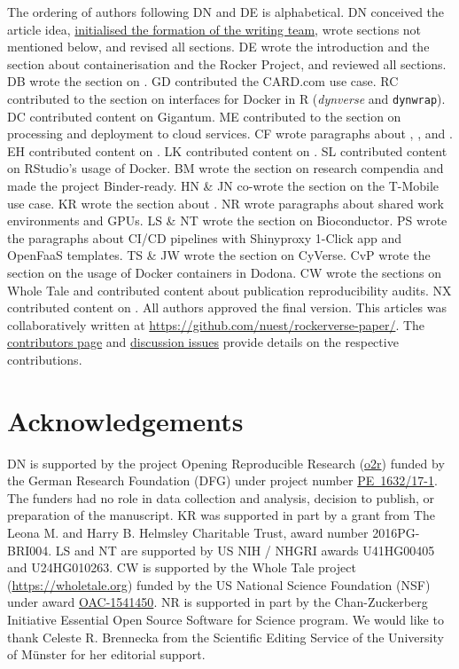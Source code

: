 The ordering of authors following DN and DE is alphabetical. DN
conceived the article idea,
\href{https://github.com/nuest/rockerverse-paper/issues/3}{initialised the formation of the writing team},
wrote sections not mentioned below, and revised all sections. DE wrote
the introduction and the section about containerisation and the Rocker
Project, and reviewed all sections. DB wrote the section on
. GD contributed the CARD.com use case. RC contributed to
the section on interfaces for Docker in R (\emph{dynverse} and
\texttt{dynwrap}). DC contributed content on Gigantum. ME contributed to
the section on processing and deployment to cloud services. CF wrote
paragraphs about , ,  and
. EH contributed content on . LK contributed
content on . SL contributed content on RStudio's usage of
Docker. BM wrote the section on research compendia and made the project
Binder-ready. HN \& JN co-wrote the section on the T-Mobile use case. KR
wrote the section about . NR wrote paragraphs about
shared work environments and GPUs. LS \& NT wrote the section on
Bioconductor. PS wrote the paragraphs about CI/CD pipelines with
Shinyproxy 1-Click app and OpenFaaS templates. TS \& JW wrote the
section on CyVerse. CvP wrote the section on the usage of Docker
containers in Dodona. CW wrote the sections on Whole Tale and
contributed content about publication reproducibility audits. NX
contributed content on . All authors approved the final
version. This articles was collaboratively written at
\href{https://github.com/nuest/rockerverse-paper/}{https://github.com/nuest/rockerverse-paper/}.
The
\href{https://github.com/nuest/rockerverse-paper/graphs/contributors}{contributors page}
and
\href{https://github.com/nuest/rockerverse-paper/issues/}{discussion issues}
provide details on the respective contributions.

\hypertarget{acknowledgements}{%
\section{Acknowledgements}\label{acknowledgements}}

DN is supported by the project Opening Reproducible Research
(\href{https://www.uni-muenster.de/forschungaz/project/12343}{o2r})
funded by the German Research Foundation (DFG) under project number
\href{https://gepris.dfg.de/gepris/projekt/415851837}{PE~1632/17-1}. The
funders had no role in data collection and analysis, decision to
publish, or preparation of the manuscript. KR was supported in part by a
grant from The Leona M. and Harry B. Helmsley Charitable Trust, award
number 2016PG-BRI004. LS and NT are supported by US NIH / NHGRI awards
U41HG00405 and U24HG010263. CW is supported by the Whole Tale project
(\url{https://wholetale.org}) funded by the US National Science
Foundation (NSF) under award
\href{https://www.nsf.gov/awardsearch/showAward?AWD_ID=1541450}{OAC-1541450}.
NR is supported in part by the Chan-Zuckerberg Initiative Essential Open
Source Software for Science program. We would like to thank Celeste R.
Brennecka from the Scientific Editing Service of the University of
Münster for her editorial support.


